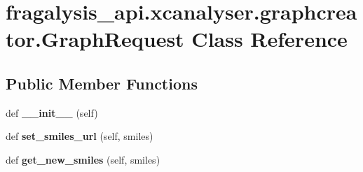 \hypertarget{classfragalysis__api_1_1xcanalyser_1_1graphcreator_1_1_graph_request}{}\section{fragalysis\+\_\+api.\+xcanalyser.\+graphcreator.\+Graph\+Request Class Reference}
\label{classfragalysis__api_1_1xcanalyser_1_1graphcreator_1_1_graph_request}
\subsection*{Public Member Functions}
\begin{DoxyCompactItemize}
\item 
\mbox{\label{classfragalysis__api_1_1xcanalyser_1_1graphcreator_1_1_graph_request_ac2cce029ca7a29dab5625823e2eb92c2}} 
def {\bfseries \+\_\+\+\_\+init\+\_\+\+\_\+} (self)
\item 
\mbox{\label{classfragalysis__api_1_1xcanalyser_1_1graphcreator_1_1_graph_request_ac47f4baba7c0cdefd43bb0c7e17646c9}} 
def {\bfseries set\+\_\+smiles\+\_\+url} (self, smiles)
\item 
\mbox{\label{classfragalysis__api_1_1xcanalyser_1_1graphcreator_1_1_graph_request_a1ca3ed55492a1722ef0feb76c7fba43f}} 
def {\bfseries get\+\_\+new\+\_\+smiles} (self, smiles)
\end{DoxyCompactItemize}
